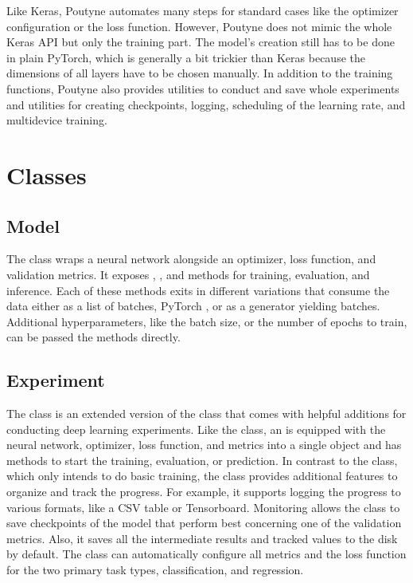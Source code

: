 \documentclass[letterpaper,10pt,english]{jupyterBook}
\begin{document}
\sphinxAtStartPar
Like Keras, Poutyne automates many steps for standard cases like the optimizer configuration or the loss function.
However, Poutyne does not mimic the whole Keras API but only the training part.
The model’s creation still has to be done in plain PyTorch, which is generally a bit trickier than Keras because the dimensions of all layers have to be chosen manually.
In addition to the training functions, Poutyne also provides utilities to conduct and save whole experiments and utilities for creating checkpoints, logging, scheduling of the learning rate, and multi\sphinxhyphen{}device training.


\section{Classes}
\label{\detokenize{Poutyne:classes}}

\subsection{Model}
\label{\detokenize{Poutyne:model}}
\sphinxAtStartPar
The  class wraps a neural network alongside an optimizer, loss function, and validation metrics.
It exposes \sphinxhyphen{}, \sphinxhyphen{}, and \sphinxhyphen{}methods for training, evaluation, and inference.
Each of these methods exits in different variations that consume the data either as a list of batches, PyTorch , or as a generator yielding batches.
Additional hyperparameters, like the batch size, or the number of epochs to train, can be passed the methods directly.


\subsection{Experiment}
\label{\detokenize{Poutyne:experiment}}
\sphinxAtStartPar
The  class is an extended version of the  class that comes with helpful additions for conducting deep learning experiments.
Like the  class, an  is equipped with the neural network, optimizer, loss function, and metrics into a single object and has methods to start the training, evaluation, or prediction.
In contrast to the  class, which only intends to do basic training, the  class provides additional features to organize and track the progress.
For example, it supports logging the progress to various formats, like a CSV table or Tensorboard.
Monitoring allows the  class to save checkpoints of the model that perform best concerning one of the validation metrics.
Also, it saves all the intermediate results and tracked values to the disk by default.
The  class can automatically configure all metrics and the loss function for the two primary task types, classification, and regression.
\end{document}
